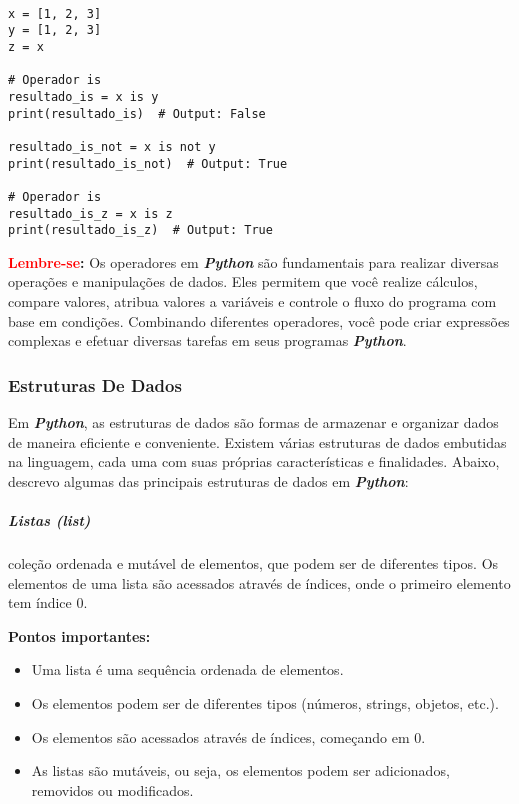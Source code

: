 \documentclass[a4paper, 12pt, onecolumn,singlespacing]{article}
\begin{document}
\begin{verbatim}
		
x = [1, 2, 3]
y = [1, 2, 3]
z = x

# Operador is
resultado_is = x is y
print(resultado_is)  # Output: False

resultado_is_not = x is not y
print(resultado_is_not)  # Output: True

# Operador is
resultado_is_z = x is z
print(resultado_is_z)  # Output: True

\end{verbatim}

	\textbf{\textcolor{red}{Lembre-se}:} Os operadores em \textbf{\textit{Python}} são fundamentais para realizar diversas operações e manipulações de dados. Eles permitem que você realize cálculos, compare valores, atribua valores a variáveis e controle o fluxo do programa com base em condições. Combinando diferentes operadores, você pode criar expressões complexas e efetuar diversas tarefas em seus programas \textbf{\textit{Python}}.
	
	\subsubsection{Estruturas De Dados}
	\label{python_estruturas_de_dados}
	Em \textbf{\textit{Python}}, as estruturas de dados são formas de armazenar e organizar dados de maneira eficiente e conveniente. Existem várias estruturas de dados embutidas na linguagem, cada uma com suas próprias características e finalidades. Abaixo, descrevo algumas das principais estruturas de dados em \textbf{\textit{Python}}:
	
	\subparagraph{Listas (\textit{list})}
	\label{python_estrutura_listas}
	 coleção ordenada e mutável de elementos, que podem ser de diferentes tipos. Os elementos de uma lista são acessados através de índices, onde o primeiro elemento tem índice 0.
	
	\textbf{Pontos importantes:}
	\begin{itemize}
		\item Uma lista é uma sequência ordenada de elementos.
		\item Os elementos podem ser de diferentes tipos (números, strings, objetos, etc.).
		\item Os elementos são acessados através de índices, começando em 0.
		\item As listas são mutáveis, ou seja, os elementos podem ser adicionados, removidos ou modificados.
	\end{itemize}
	
\end{document}
